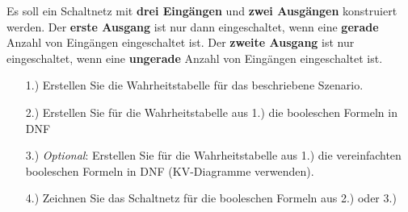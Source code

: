 \begin{exercise}
Es soll ein Schaltnetz mit \textbf{drei Eingängen} und \textbf{zwei Ausgängen} konstruiert werden. Der \textbf{erste Ausgang} ist nur dann eingeschaltet, wenn eine \textbf{gerade} Anzahl von Eingängen eingeschaltet ist. Der \textbf{zweite Ausgang} ist nur eingeschaltet, wenn eine \textbf{ungerade} Anzahl von Eingängen eingeschaltet ist.

\begin{enumerate}
\item[1.)] Erstellen Sie die Wahrheitstabelle für das beschriebene Szenario.
\item[2.)] Erstellen Sie für die Wahrheitstabelle aus 1.) die booleschen Formeln in \ac{DNF}
\item[3.)] \textit{Optional}: Erstellen Sie für die Wahrheitstabelle aus 1.) die vereinfachten booleschen Formeln in \ac{DNF} (\ac{KV}-Diagramme verwenden).
\item[4.)] Zeichnen Sie das Schaltnetz für die booleschen Formeln aus 2.) oder 3.)
\end{enumerate}
\end{exercise}


\newpage